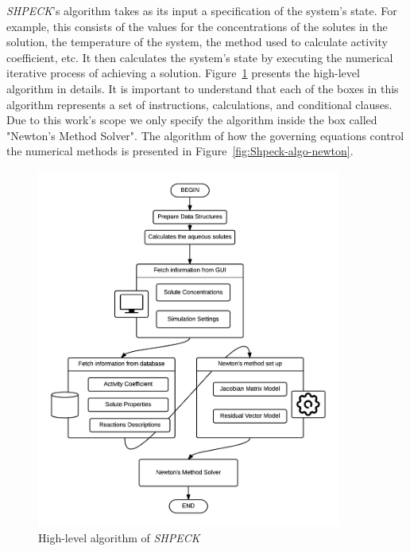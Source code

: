 \emph{SHPECK}'s algorithm takes as its input a specification of the system's state. For example, this consists of the values for the concentrations of the solutes in the solution, the temperature of the system, the method used to calculate activity coefficient, etc. It then calculates the system's state by executing the numerical iterative process of achieving a solution. 
Figure~\ref{fig:Shpeck-algo} presents the high-level algorithm in details. It is important to understand that each of the boxes in this algorithm represents a set of instructions, calculations, and conditional clauses. Due to this work's scope we only specify the algorithm inside the box called "Newton's Method Solver". The algorithm of how the governing equations control the numerical methods is presented in Figure~\ref{fig:Shpeck-algo-newton}. 
\begin{figure}[ht!]
\centering
\includegraphics[width=100mm]{figures/Shpeck_algo3.png}
\caption{High-level algorithm of \emph{SHPECK}}
\label{fig:Shpeck-algo}
\end{figure}
